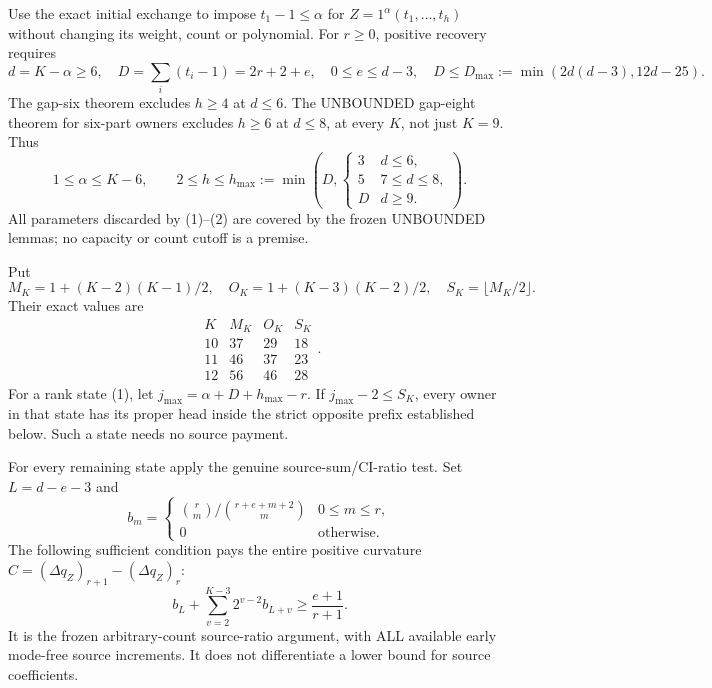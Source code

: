 Use the exact initial exchange to impose $t_1-1\le\alpha$ for
$Z=1^\alpha(t_1,\ldots,t_h)$ without changing its weight, count or
polynomial. For $r\ge0$, positive recovery requires
\[
 d=K-\alpha\ge6,\quad D=\sum_i(t_i-1)=2r+2+e,
 \quad 0\le e\le d-3,
 \quad D\le D_{\max}:=\min(2d(d-3),12d-25).
                                                        \tag{1}
\]
The gap-six theorem excludes $h\ge4$ at $d\le6$.
The UNBOUNDED gap-eight theorem for six-part owners excludes
$h\ge6$ at $d\le8$, at every $K$, not just $K=9$. Thus
\[
 1\le\alpha\le K-6,\qquad
 2\le h\le h_{\max}:=\min\left(D,
 \begin{cases}3&d\le6,\\5&7\le d\le8,\\D&d\ge9.\end{cases}\right).
                                                        \tag{2}
\]
All parameters discarded by (1)--(2) are covered by the frozen
UNBOUNDED lemmas; no capacity or count cutoff is a premise.

Put
\[
 M_K=1+(K-2)(K-1)/2,\quad O_K=1+(K-3)(K-2)/2,
 \quad S_K=\lfloor M_K/2\rfloor.
\]
Their exact values are
\[
\begin{array}{c|rrr}K&M_K&O_K&S_K\\\hline
10&37&29&18\\11&46&37&23\\12&56&46&28
\end{array}.                                             \tag{3}
\]
For a rank state (1), let $j_{\max}=\alpha+D+h_{\max}-r$.
If $j_{\max}-2\le S_K$, every owner in that state has its proper
head inside the strict opposite prefix established below. Such a state
needs no source payment.

For every remaining state apply the genuine source-sum/CI-ratio test.
Set $L=d-e-3$ and
\[
 b_m=\begin{cases}
 \binom r m/\binom{r+e+m+2}m&0\le m\le r,\\0&\text{otherwise}.
 \end{cases}
\]
The following sufficient condition pays the entire positive curvature
$C=(\Delta q_Z)_{r+1}-(\Delta q_Z)_r$:
\[
             b_L+\sum_{v=2}^{K-3}2^{v-2}b_{L+v}
                           \ge\frac{e+1}{r+1}.          \tag{4}
\]
It is the frozen arbitrary-count source-ratio argument, with ALL
available early mode-free source increments. It does not differentiate
a lower bound for source coefficients.

